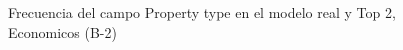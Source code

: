 \begin{figure}[H]
    \centering
    
    \caption{Frecuencia del campo Property type en el modelo real y Top 2, Economicos (B-2)}
    \label{frecuency-Property Type-top2}
\end{figure}